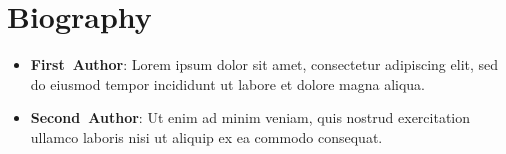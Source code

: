 \documentclass[12pt]{article}
\begin{document}
\section*{Biography}
\begin{itemize}[leftmargin=*, label={}]
  \item \textbf{First Author}: Lorem ipsum dolor sit amet, consectetur adipiscing elit, sed do eiusmod tempor incididunt ut labore et dolore magna aliqua.
  \item \textbf{Second Author}: Ut enim ad minim veniam, quis nostrud exercitation ullamco laboris nisi ut aliquip ex ea commodo consequat.
\end{itemize}

\end{document}
